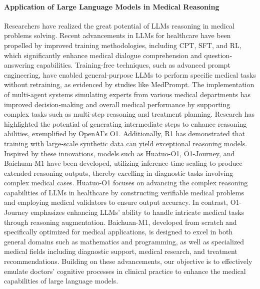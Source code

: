 \paragraph{Application of Large Language Models in Medical Reasoning} Researchers have realized the great potential of LLMs reasoning in medical problems solving\cite{zhou2023survey,karttunen2023large,hua2024large}. Recent advancements in LLMs for healthcare have been propelled by improved training methodologies, including CPT, SFT, and RL, which significantly enhance medical dialogue comprehension and question-answering capabilities\cite{zhou2023survey,lee2020biobert,alsentzer2019publicly,peng2023study,xiong2023doctorglm,li2023chatdoctor,han2023medalpaca,ye2023qilin,yang2024zhongjing,wu2024clinical,singhal2025toward,singhal2023large,MedicalGPT,wang2023huatuo,wu2024pmc,bao2023disc,zhang2023biomedgpt,chen2024huatuogpt,wang2024apollo,zheng2024efficiently,christophe2024med42}. Training-free techniques, such as advanced prompt engineering, have enabled general-purpose LLMs to perform specific medical tasks without retraining, as evidenced by studies like MedPrompt\cite{liu2023deid,singhal2023large,nori2023can,bayarri2024prompt,liu2024medcot,wu2024knowlab_aimed,lievin2024can,saab2024capabilities}. The implementation of multi-agent systems simulating experts from various medical departments has improved decision-making and overall medical performance by supporting complex tasks such as multi-step reasoning and treatment planning\cite{chen2024cod,tang2023medagents,schmidgall2024agentclinic,li2024agent}. Research has highlighted the potential of generating intermediate steps to enhance reasoning abilities, exemplified by OpenAI’s O1\cite{xie2024preliminary}. Additionally, R1 has demonstrated that training with large-scale synthetic data can yield exceptional reasoning models\cite{guo2025deepseek}. Inspired by these innovations, models such as Huatuo-O1\cite{chen2024huatuogpto1medicalcomplexreasoning}, O1-Journey\cite{qin2024o1,huang2025o1}, and Baichuan-M1\cite{wang2025baichuan} have been developed, utilizing inference-time scaling to produce extended reasoning outputs, thereby excelling in diagnostic tasks involving complex medical cases\cite{yuan2023scaling}. Huatuo-O1 focuses on advancing the complex reasoning capabilities of LLMs in healthcare by constructing verifiable medical problems and employing medical validators to ensure output accuracy. In contrast, O1-Journey emphasizes enhancing LLMs' ability to handle intricate medical tasks through reasoning augmentation. Baichuan-M1, developed from scratch and specifically optimized for medical applications, is designed to excel in both general domains such as mathematics and programming, as well as specialized medical fields including diagnostic support, medical research, and treatment recommendations. Building on these advancements, our objective is to effectively emulate doctors' cognitive processes in clinical practice to enhance the medical capabilities of large language models.

